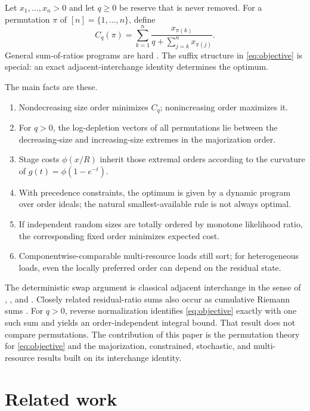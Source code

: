 \documentclass[pdflatex,iicol,sn-basic]{sn-jnl}
\theoremstyle{thmstyleone}
\theoremstyle{thmstyletwo}
\theoremstyle{thmstylethree}
\begin{document}
Let \(x_1,\dots,x_n>0\) and let \(q\ge 0\) be reserve that is never removed.
For a permutation \(\pi\) of \([n]=\{1,\ldots,n\}\), define
\begin{equation}\label{eq:objective}
C_q(\pi)
=
\sum_{k=1}^{n}
\frac{x_{\pi(k)}}{q+\sum_{j=k}^{n}x_{\pi(j)}}.
\end{equation}
General sum-of-ratios programs are hard \citep{SchaibleShi2003}. The suffix
structure in \eqref{eq:objective} is special: an exact adjacent-interchange
identity determines the optimum.

The main facts are these.
\begin{enumerate}[leftmargin=2em]
  \item Nondecreasing size order minimizes \(C_q\); nonincreasing order maximizes it.
  \item For \(q>0\), the log-depletion vectors of all permutations lie between
  the decreasing-size and increasing-size extremes in the majorization order.
  \item Stage costs \(\phi(x/R)\) inherit those extremal orders according to the
  curvature of \(g(t)=\phi(1-e^{-t})\).
  \item With precedence constraints, the optimum is given by a dynamic program
  over order ideals; the natural smallest-available rule is not always optimal.
  \item If independent random sizes are totally ordered by monotone likelihood
  ratio, the corresponding fixed order minimizes expected cost.
  \item Componentwise-comparable multi-resource loads still sort; for
  heterogeneous loads, even the locally preferred order can depend on the
  residual state.
\end{enumerate}

The deterministic swap argument is classical adjacent interchange in the sense
of \citet{Smith1956}, \citet{Sidney1975}, and \citet{Lawler1978}. Closely
related residual-ratio sums also occur as cumulative Riemann sums
\citep{Pain2026}. For \(q>0\), reverse normalization identifies
\eqref{eq:objective} exactly with one such sum and yields an order-independent
integral bound. That result does not compare permutations. The contribution of
this paper is the permutation theory for \eqref{eq:objective} and the
majorization, constrained, stochastic, and multi-resource results built on its
interchange identity.

\section{Related work}
\label{sec:related}
\end{document}

